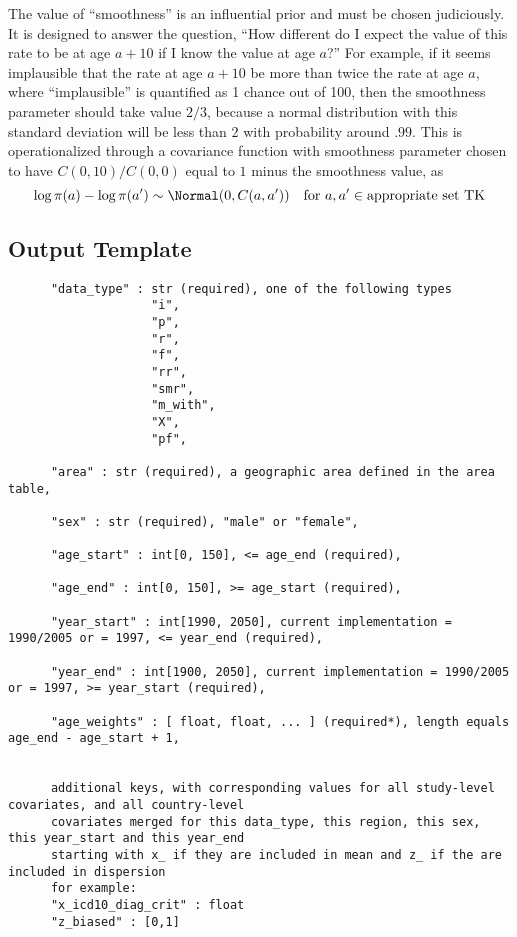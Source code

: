 The value of ``smoothness'' is an influential prior and must be chosen
judiciously.  It is designed to answer the question, ``How different
do I expect the value of this rate to be at age $a+10$ if I know the
value at age $a$?''  For example, if it seems implausible that the
rate at age $a+10$ be more than twice the rate at age $a$, where
``implausible'' is quantified as 1 chance out of 100, then the
smoothness parameter should take value $2/3$, because a normal
distribution with this standard deviation will be less than $2$ with
probability around $.99$.  This is operationalized through a \Matern
covariance function with smoothness parameter chosen to have $C(0,
10) / C(0,0)$ equal to $1$ minus the smoothness value, as
\[
\log \pi(a) - \log \pi(a') \sim \Normal(0, C(a, a')) \quad \text{for } a, a' \in \text{appropriate set TK}
\]

\subsection{Output Template}
\begin{verbatim}
      "data_type" : str (required), one of the following types
                    "i",
                    "p",
                    "r",
                    "f",
                    "rr",
                    "smr",
                    "m_with",
                    "X",
                    "pf", 

      "area" : str (required), a geographic area defined in the area table,

      "sex" : str (required), "male" or "female",

      "age_start" : int[0, 150], <= age_end (required),

      "age_end" : int[0, 150], >= age_start (required),

      "year_start" : int[1990, 2050], current implementation = 1990/2005 or = 1997, <= year_end (required),

      "year_end" : int[1900, 2050], current implementation = 1990/2005 or = 1997, >= year_start (required),

      "age_weights" : [ float, float, ... ] (required*), length equals age_end - age_start + 1,


      additional keys, with corresponding values for all study-level covariates, and all country-level   
      covariates merged for this data_type, this region, this sex, this year_start and this year_end
      starting with x_ if they are included in mean and z_ if the are included in dispersion
      for example:
      "x_icd10_diag_crit" : float
      "z_biased" : [0,1]
\end{verbatim}

